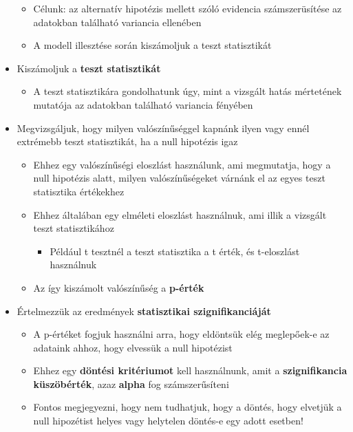 \documentclass[
  letterpaper,
  DIV=11,
  numbers=noendperiod]{scrreprt}
\providecommand{\tightlist}{%
  \setlength{\itemsep}{0pt}\setlength{\parskip}{0pt}}\usepackage{longtable,booktabs,array}
\begin{document}
\begin{itemize}
  \begin{itemize}
  \item
    Célunk: az alternatív hipotézis mellett szóló evidencia
    számszerüsítése az adatokban található variancia ellenében
  \item
    A modell illesztése során kiszámoljuk a teszt statisztikát
  \end{itemize}
\item
  Kiszámoljuk a \textbf{teszt statisztikát}

  \begin{itemize}
  \tightlist
  \item
    A teszt statisztikára gondolhatunk úgy, mint a vizsgált hatás
    mértetének mutatója az adatokban található variancia fényében
  \end{itemize}
\item
  Megvizsgáljuk, hogy milyen valószínűséggel kapnánk ilyen vagy ennél
  extrémebb teszt statisztikát, ha a null hipotézis igaz

  \begin{itemize}
  \item
    Ehhez egy valószínűségi eloszlást használunk, ami megmutatja, hogy a
    null hipotézis alatt, milyen valószínűségeket várnánk el az egyes
    teszt statisztika értékekhez
  \item
    Ehhez általában egy elméleti eloszlást használnuk, ami illik a
    vizsgált teszt statisztikához

    \begin{itemize}
    \tightlist
    \item
      Például t tesztnél a teszt statisztika a t érték, és t-eloszlást
      használnuk
    \end{itemize}
  \item
    Az így kiszámolt valószínűség a \textbf{p-érték}
  \end{itemize}
\item
  Értelmezzük az eredmények \textbf{statisztikai szignifikanciáját}

  \begin{itemize}
  \item
    A p-értéket fogjuk használni arra, hogy eldöntsük elég meglepőek-e
    az adataink ahhoz, hogy elvessük a null hipotézist
  \item
    Ehhez egy \textbf{döntési kritériumot} kell használnunk, amit a
    \textbf{szignifikancia küszöbérték}, azaz \textbf{alpha} fog
    számszerűsíteni
  \item
    Fontos megjegyezni, hogy nem tudhatjuk, hogy a döntés, hogy elvetjük
    a null hipozétist helyes vagy helytelen döntés-e egy adott esetben!


\end{itemize}
\end{itemize}
\end{document}
